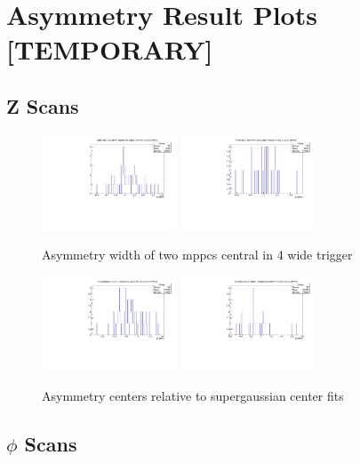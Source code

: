 \newpage
 


\section{Asymmetry Result Plots \bf [TEMPORARY]}

\subsection{Z Scans}

\begin{figure}[H]
\centering
\includegraphics[width=4cm]{asymmetryplots/azxwid2.pdf}
\includegraphics[width=4cm]{asymmetryplots/azxwid3.pdf}
\caption{Asymmetry width of two mppcs central in 4 wide trigger}
\label{fig:asymzwids} 
\end{figure}
\begin{figure}[H]
\centering
\includegraphics[width=4cm]{asymmetryplots/az-sgz2.pdf}
\includegraphics[width=4cm]{asymmetryplots/az-sgz3.pdf}
\caption{Asymmetry centers relative to supergaussian center fits}
\label{fig:asymzcentdiff} 
\end{figure}

\subsection{$\phi$ Scans}

